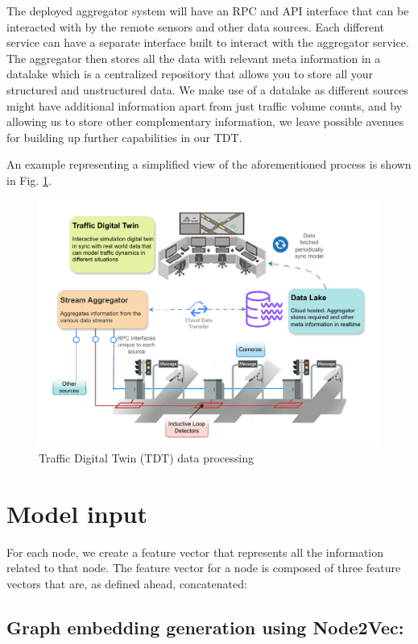 The deployed aggregator system will have an RPC and API interface that can be interacted with by the remote sensors and other data sources. Each different service can have a separate interface built to interact with the aggregator service. The aggregator then stores all the data with relevant meta information in a datalake which is a centralized repository that allows you to store all your structured and unstructured data. We make use of a datalake as different sources might have additional information apart from just traffic volume counts, and by allowing us to store other complementary information, we leave possible avenues for building up further capabilities in our TDT.

An example representing a simplified view of the aforementioned process is shown in Fig. \ref{fig:framework}.

\begin{figure}[t]
  \centering
  \includegraphics[width=1\textwidth]{images/framework.pdf} %
  \caption{Traffic Digital Twin (TDT) data processing}
  \label{fig:framework}
\end{figure}

\section{\textbf{Model input}}

For each node, we create a feature vector that represents all the information related to that node. The feature vector for a node is composed of three feature vectors that are, as defined ahead, concatenated:

\subsection{Graph embedding generation using Node2Vec:}

